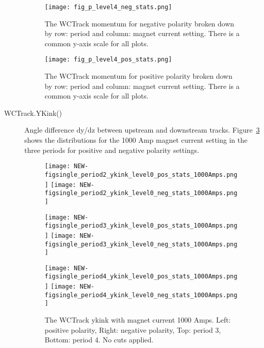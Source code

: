 \begin{description}
{}


 
 
 
 
 \begin{figure}
   \centering   
 \texttt{[image: fig\_p\_level4\_neg\_stats.png]}
 \caption[short]{The WCTrack momentum for negative polarity broken down by row: period and column: magnet current setting. There is a common y-axis scale for all plots.}
 \label{fig:p12_neg}
  \end{figure}
 
 
  \begin{figure}
    \centering   
 \texttt{[image: fig\_p\_level4\_pos\_stats.png]}
 \caption[short]{The WCTrack momentum for positive polarity broken down by row: period and column: magnet current setting. There is a common y-axis scale for all plots.}
 \label{fig:p12_pos}
  \end{figure}
  
  
  
  \item[WCTrack.YKink()] {  Angle difference dy/dz  between upstream and downstream tracks. Figure~\ref{fig_ykink} shows the  distributions for the 1000 Amp magnet current setting in the three periods for positive and negative polarity settings.
    \begin{figure}[h]
      \centering   
       	\texttt{[image: NEW-figsingle\_period2\_ykink\_level0\_pos\_stats\_1000Amps.png]}
	 \texttt{[image: NEW-figsingle\_period2\_ykink\_level0\_neg\_stats\_1000Amps.png]}
	 
   	\texttt{[image: NEW-figsingle\_period3\_ykink\_level0\_pos\_stats\_1000Amps.png]}
	 \texttt{[image: NEW-figsingle\_period3\_ykink\_level0\_neg\_stats\_1000Amps.png]}
	 
 	\texttt{[image: NEW-figsingle\_period4\_ykink\_level0\_pos\_stats\_1000Amps.png]}
	 \texttt{[image: NEW-figsingle\_period4\_ykink\_level0\_neg\_stats\_1000Amps.png]}
   \caption[short]{The WCTrack ykink with magnet current 1000 Amps. Left: positive polarity, Right: negative polarity, Top: period 3, Bottom: period 4. No cuts applied.}
   \label{fig_ykink}
  \end{figure}
  }
  

\end{description}
